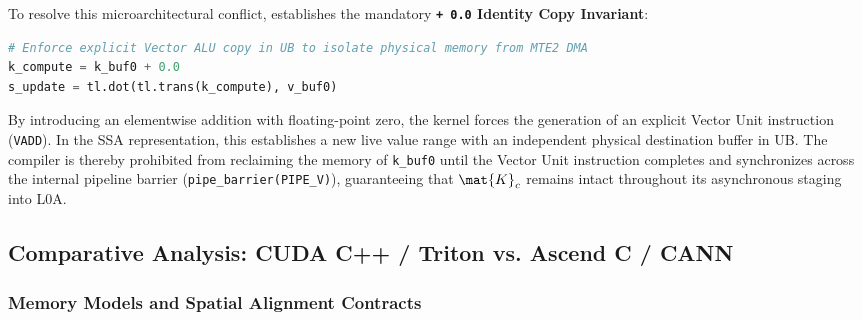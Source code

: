 To resolve this microarchitectural conflict, \neuralops{} establishes the mandatory \textbf{\texttt{+ 0.0} Identity Copy Invariant}:
\begin{lstlisting}[language=Python]
# Enforce explicit Vector ALU copy in UB to isolate physical memory from MTE2 DMA
k_compute = k_buf0 + 0.0
s_update = tl.dot(tl.trans(k_compute), v_buf0)
\end{lstlisting}
By introducing an elementwise addition with floating-point zero, the kernel forces the generation of an explicit Vector Unit instruction (\texttt{VADD}). In the SSA representation, this establishes a new live value range with an independent physical destination buffer in UB. The compiler is thereby prohibited from reclaiming the memory of \texttt{k\_buf0} until the Vector Unit instruction completes and synchronizes across the internal pipeline barrier (\texttt{pipe\_barrier(PIPE\_V)}), guaranteeing that $\mat{K}_c$ remains intact throughout its asynchronous staging into L0A.

\subsection{Comparative Analysis: CUDA C++ / Triton vs. Ascend C / CANN}
\label{sec:appendix_comparative_analysis}

\subsubsection{Memory Models and Spatial Alignment Contracts}
\label{sec:appendix_memory_models}

